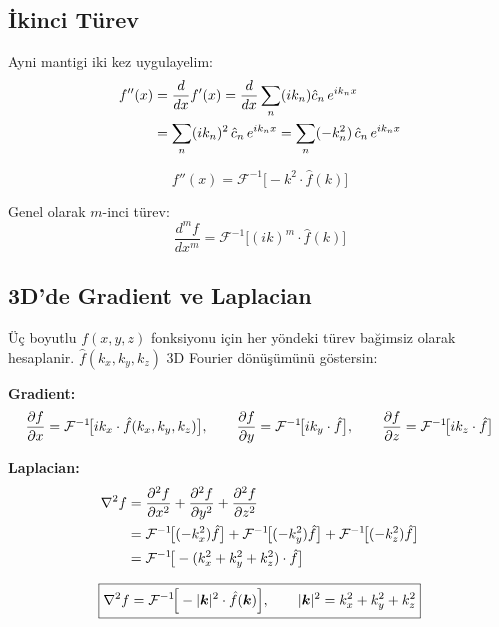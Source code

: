 \subsection{İkinci Türev}

Ayni mantigi iki kez uygulayelim:
\begin{align}
f''(x) &= \frac{d}{dx}f'(x) = \frac{d}{dx}\sum_n (ik_n)\hat{c}_n\,e^{ik_n x} \notag \\
&= \sum_n (ik_n)^2\,\hat{c}_n\,e^{ik_n x} = \sum_n (-k_n^2)\,\hat{c}_n\,e^{ik_n x}
\end{align}

\begin{equation}
\boxed{f''(x) = \mathcal{F}^{-1}\!\big[-k^2 \cdot \hat{f}(k)\big]}
\label{eq:spectral_2nd_deriv}
\end{equation}

Genel olarak $m$-inci türev:
\begin{equation}
\frac{d^m f}{dx^m} = \mathcal{F}^{-1}\!\big[(ik)^m \cdot \hat{f}(k)\big]
\label{eq:spectral_mth_deriv}
\end{equation}

\subsection{3D'de Gradient ve Laplacian}

Üç boyutlu $f(x,y,z)$ fonksiyonu için her yöndeki türev bağimsiz olarak hesaplanir. $\hat{f}(k_x,k_y,k_z)$ 3D Fourier dönüşümünü göstersin:

\textbf{Gradient:}
\begin{equation}
\frac{\partial f}{\partial x} = \mathcal{F}^{-1}\!\big[ik_x\cdot\hat{f}(k_x,k_y,k_z)\big], \qquad
\frac{\partial f}{\partial y} = \mathcal{F}^{-1}\!\big[ik_y\cdot\hat{f}\big], \qquad
\frac{\partial f}{\partial z} = \mathcal{F}^{-1}\!\big[ik_z\cdot\hat{f}\big]
\label{eq:3d_gradient}
\end{equation}

\textbf{Laplacian:}
\begin{align}
\nabla^2 f &= \frac{\partial^2 f}{\partial x^2} + \frac{\partial^2 f}{\partial y^2} + \frac{\partial^2 f}{\partial z^2} \notag \\
&= \mathcal{F}^{-1}\!\big[(-k_x^2)\hat{f}\big] + \mathcal{F}^{-1}\!\big[(-k_y^2)\hat{f}\big] + \mathcal{F}^{-1}\!\big[(-k_z^2)\hat{f}\big] \notag \\
&= \mathcal{F}^{-1}\!\big[-(k_x^2 + k_y^2 + k_z^2)\cdot\hat{f}\big]
\end{align}

\begin{equation}
\boxed{\nabla^2 f = \mathcal{F}^{-1}\!\Big[-|\bm{k}|^2 \cdot \hat{f}(\bm{k})\Big], \qquad |\bm{k}|^2 = k_x^2 + k_y^2 + k_z^2}
\label{eq:spectral_laplacian_3d}
\end{equation}

